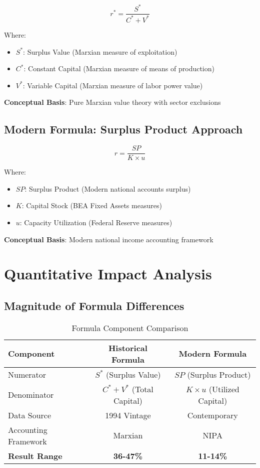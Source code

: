 \documentclass[12pt]{article}
\begin{document}
\begin{equation}
r^* = \frac{S^*}{C^* + V^*}
\end{equation}

Where:
\begin{itemize}
    \item $S^*$: Surplus Value (Marxian measure of exploitation)
    \item $C^*$: Constant Capital (Marxian measure of means of production)
    \item $V^*$: Variable Capital (Marxian measure of labor power value)
\end{itemize}

\textbf{Conceptual Basis}: Pure Marxian value theory with sector exclusions

\subsection{Modern Formula: Surplus Product Approach}

\begin{equation}
r = \frac{SP}{K \times u}
\end{equation}

Where:
\begin{itemize}
    \item $SP$: Surplus Product (Modern national accounts surplus)
    \item $K$: Capital Stock (BEA Fixed Assets measures)
    \item $u$: Capacity Utilization (Federal Reserve measures)
\end{itemize}

\textbf{Conceptual Basis}: Modern national income accounting framework

\section{Quantitative Impact Analysis}

\subsection{Magnitude of Formula Differences}

\begin{table}[h]
\centering
\begin{tabular}{lcc}
\toprule
\textbf{Component} & \textbf{Historical Formula} & \textbf{Modern Formula} \\
\midrule
Numerator & $S^*$ (Surplus Value) & $SP$ (Surplus Product) \\
Denominator & $C^* + V^*$ (Total Capital) & $K \times u$ (Utilized Capital) \\
Data Source & 1994 Vintage & Contemporary \\
Accounting Framework & Marxian & NIPA \\
\textbf{Result Range} & \textbf{36-47\%} & \textbf{11-14\%} \\
\bottomrule
\end{tabular}
\caption{Formula Component Comparison}
\label{tab:formula_comparison}
\end{table}
\end{document}
